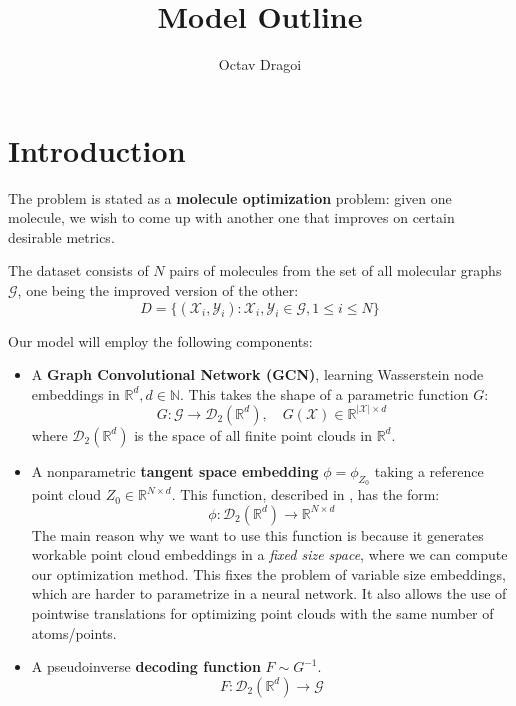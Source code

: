\documentclass{article}
\begin{document}
\title{Model Outline}
\author{Octav Dragoi}

\maketitle

\section{Introduction}

The problem is stated as a \textbf{molecule optimization} problem: given one molecule, we wish to come up with another one that improves on certain desirable metrics.

The dataset consists of $N$ pairs of molecules from the set of all molecular graphs $\mathcal{G}$, one being the improved version of the other:
\begin{equation}
    \label{eq:problem_setup}
    D = \{(\mathcal{X}_i, \mathcal{Y}_i) : \mathcal{X}_i, \mathcal{Y}_i\in \mathcal{G}, 1\leq i\leq N\}
\end{equation}

Our model will employ the following components:
\begin{itemize}
    \item A \textbf{Graph Convolutional Network (GCN)}, learning Wasserstein node embeddings in $\mathbb{R}^d, d\in \mathbb{N}$. This takes the shape of a parametric function $G$:
    \[G:\mathcal{G} \rightarrow \mathscr{D}_2({\mathbb{R}^d}),\quad G(\mathcal{X})\in \mathbb{R}^{|\mathcal{X}|\times d} \] 
    where $\mathscr{D}_2({\mathbb{R}^d})$ is the space of all finite point clouds in $\mathbb{R}^d$.
    \item A nonparametric \textbf{tangent space embedding} $\phi = \phi_{Z_0}$ taking a reference point cloud $Z_0\in \mathbb{R}^{N\times d}$. This function, described in \cite{kolouri2020wasserstein}, has the form:
    \[\phi : \mathscr{D}_2({\mathbb{R}^d}) \rightarrow \mathbb{R}^{N\times d}\]
    The main reason why we want to use this function is because it generates workable point cloud embeddings in a \textit{fixed size space}, where we can compute our optimization method. This fixes the problem of variable size embeddings, which are harder to parametrize in a neural network. It also allows the use of pointwise translations for optimizing point clouds with the same number of atoms/points.
    \item A pseudoinverse \textbf{decoding function} $F\sim G^{-1}$.
    \[F : \mathscr{D}_2({\mathbb{R}^d})\rightarrow \mathcal{G}\]
\end{itemize}
\end{document}
